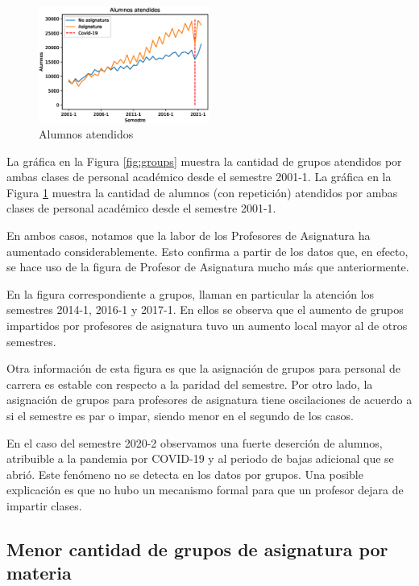 \documentclass[twocolumn]{article}
\theoremstyle{definition}
\begin{document}
\begin{figure}
    \centering
    \includegraphics[width=0.5\textwidth]{fig/alumnos.eps}
    \caption{Alumnos atendidos}
    \label{fig:students}
\end{figure}


La gráfica en la Figura \ref{fig:groups} muestra la cantidad de grupos atendidos por ambas clases de personal académico desde el semestre 2001-1. La gráfica en la Figura \ref{fig:students} muestra la cantidad de alumnos (con repetición) atendidos por ambas clases de personal académico desde el semestre 2001-1.

En ambos casos, notamos que la labor de los Profesores de Asignatura ha aumentado considerablemente. Esto confirma a partir de los datos que, en efecto, se hace uso de la figura de Profesor de Asignatura mucho más que anteriormente.

En la figura correspondiente a grupos, llaman en particular la atención los semestres 2014-1, 2016-1 y 2017-1. En ellos se observa que el aumento de grupos impartidos por profesores de asignatura tuvo un aumento local mayor al de otros semestres.

Otra información de esta figura es que la asignación de grupos para personal de carrera es estable con respecto a la paridad del semestre. Por otro lado, la asignación de grupos para profesores de asignatura tiene oscilaciones de acuerdo a si el semestre es par o impar, siendo menor en el segundo de los casos.

En el caso del semestre 2020-2 observamos una fuerte deserción de alumnos, atribuible a la pandemia por COVID-19 y al periodo de bajas adicional que se abrió. Este fenómeno no se detecta en los datos por grupos. Una posible explicación es que no hubo un mecanismo formal para que un profesor dejara de impartir clases.

\subsection{Menor cantidad de grupos de asignatura por materia}
\end{document}
